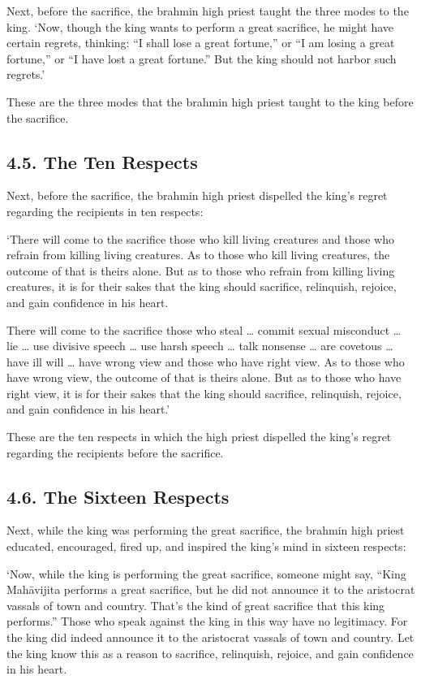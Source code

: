 \documentclass[12pt,openany]{book}%
\begin{document}
Next, before the sacrifice, the brahmin high priest taught the three modes to the king. ‘Now, though the king wants to perform a great sacrifice, he might have certain regrets, thinking: “I shall lose a great fortune,” or “I am losing a great fortune,” or “I have lost a great fortune.” But the king should not harbor such regrets.’ 

These are the three modes that the brahmin high priest taught to the king before the sacrifice. 

\subsection*{4.5. The Ten Respects }

Next, before the sacrifice, the brahmin high priest dispelled the king’s regret regarding the recipients in ten respects: 

‘There will come to the sacrifice those who kill living creatures and those who refrain from killing living creatures. As to those who kill living creatures, the outcome of that is theirs alone. But as to those who refrain from killing living creatures, it is for their sakes that the king should sacrifice, relinquish, rejoice, and gain confidence in his heart. 

There will come to the sacrifice those who steal … commit sexual misconduct … lie … use divisive speech … use harsh speech … talk nonsense … are covetous … have ill will … have wrong view and those who have right view. As to those who have wrong view, the outcome of that is theirs alone. But as to those who have right view, it is for their sakes that the king should sacrifice, relinquish, rejoice, and gain confidence in his heart.’ 

These are the ten respects in which the high priest dispelled the king’s regret regarding the recipients before the sacrifice. 

\subsection*{4.6. The Sixteen Respects }

Next, while the king was performing the great sacrifice, the brahmin high priest educated, encouraged, fired up, and inspired the king’s mind in sixteen respects: 

‘Now, while the king is performing the great sacrifice, someone might say, “King \textsanskrit{Mahāvijita} performs a great sacrifice, but he did not announce it to the aristocrat vassals of town and country. That’s the kind of great sacrifice that this king performs.” Those who speak against the king in this way have no legitimacy. For the king did indeed announce it to the aristocrat vassals of town and country. Let the king know this as a reason to sacrifice, relinquish, rejoice, and gain confidence in his heart. 
\end{document}
